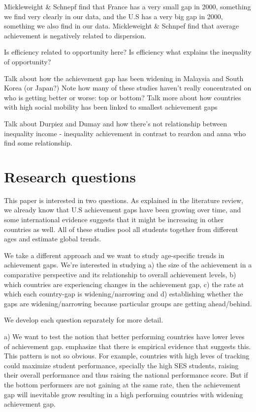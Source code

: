\documentclass[11pt, a4paper]{article}\usepackage[]{graphicx}\usepackage[]{color}
\begin{document}
Mickleweight \& Schnepf find that France has a very small gap in 2000, something we find very clearly in our data, and the U.S has a very big gap in 2000, something we also find in our data. Mickleweight \& Schnpef find
that average achievement is negatively related to dispersion.

Is efficiency related to opportunity here? Is efficiency what explains the inequality of opportunity?

Talk about how the achievement gap has been widening in Malaysia and South Korea (or Japan?)
Note how many of these studies haven't really concentrated on who is getting better or worse: top or bottom?
Talk more about how countries with high social mobility has been linked to smallest achievement gaps

Talk about Durpiez and Dumay and how there's not relationship between inequality income - inequality achievement in contrast to reardon and anna who find some relationship.

\section{Research questions}

This paper is interested in two questions. As explained in the literature review, we already know that U.S achievement gaps have been growing over time, and some international evidence suggests that it might be increasing in other countries as well. All of these studies pool all students together from different ages and estimate global trends.

We take a different approach and we want to study age-specific trends in achievement gaps. We're interested in studying a) the size of the achievement in a comparative perspective and its relationship to overall achievement levels, b) which countries are experiencing changes in the achievement gap, c) the rate at which each country-gap is widening/narrowing and d) establishing whether the gaps are widening/narrowing because particular groups are getting ahead/behind.

We develop each question separately for more detail.


a) We want to test the notion that better performing countries have lower leves of achievement gap. \citep{werfhorst_mijs} emphasize that there is empirical evidence that suggests this. This pattern is not so obvious. For example, countries with high leves of tracking could maximize student performance, specially the high SES students, raising their overall performance and thus raising the national performance score. But if the bottom performers are not gaining at the same rate, then the achievement gap will inevitable grow resulting in a high performing countries with widening achievement gap.
\end{document}
